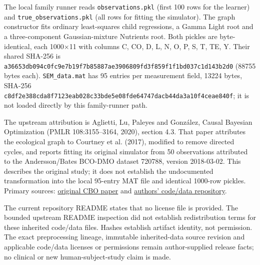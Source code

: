 The local family runner reads \nolinkurl{observations.pkl} (first 100 rows for the learner) and \nolinkurl{true_observations.pkl} (all rows for fitting the simulator). The graph constructor fits ordinary least-squares child regressions, a Gamma Light root and a three-component Gaussian-mixture Nutrients root. Both pickles are byte-identical, each 1000\ensuremath{\times}11 with columns C, CO, D, L, N, O, P, S, T, TE, Y. Their shared SHA-256 is \nolinkurl{a36653db094c0fc9e7b19f7b85887ae3906809fd3f859f1f1bd037c1d143b2d0} (88755 bytes each). \nolinkurl{SEM_data.mat} has 95 entries per measurement field, 13224 bytes, SHA-256 \nolinkurl{c8df2e388cda8f7123eab028c33bde5e08fde64747dacb44da3a10f4ceae840f}; it is not loaded directly by this family-runner path.

The upstream attribution is Aglietti, Lu, Paleyes and González, Causal Bayesian Optimization (PMLR 108:3155--3164, 2020), section 4.3. That paper attributes the ecological graph to Courtney et al. (2017), modified to remove directed cycles, and reports fitting its original simulator from 50 observations attributed to the Andersson/Bates BCO-DMO dataset 720788, version 2018-03-02. This describes the original study; it does not establish the undocumented transformation into the local 95-entry MAT file and identical 1000-row pickles. Primary sources: \href{https://proceedings.mlr.press/v108/aglietti20a/aglietti20a.pdf}{original CBO paper} and \href{https://github.com/VirgiAgl/CausalBayesianOptimization}{authors' code/data repository}.

The current repository README states that no license file is provided. The bounded upstream README inspection did not establish redistribution terms for these inherited code/data files. Hashes establish artifact identity, not permission. The exact preprocessing lineage, immutable inherited-data source revision and applicable code/data licenses or permissions remain author-supplied release facts; no clinical or new human-subject-study claim is made.
